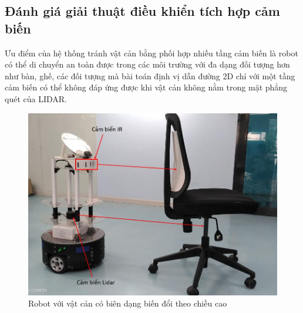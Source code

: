 \subsection{Đánh giá giải thuật điều khiển tích hợp cảm biến}


Ưu điểm của hệ thống tránh vật cản bằng phối hợp nhiều tầng cảm biến là robot có thể di chuyển an toàn được trong các môi trường với đa dạng đối tượng hơn như bàn, ghế, các đối tượng mà bài toán định vị dẫn đường 2D chỉ với một tầng cảm biến có thể không đáp ứng được khi vật cản không nằm trong mặt phẳng quét của LIDAR.

\begin{figure}[htbp]
    \centering
    \includegraphics[width=0.5\linewidth]{figures/RB_scenario_ir_detectingObstacle.png}
    \caption{Robot với vật cản có biên dạng biến đổi theo chiều cao}
    \label{fig:scenario_ir_detectedObstacle}
\end{figure}

